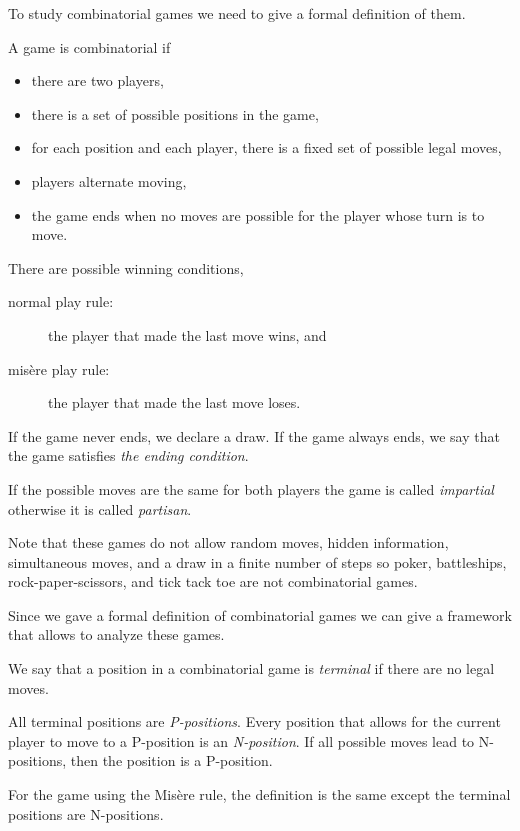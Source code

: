 To study combinatorial games we need to give a formal definition of them.
\begin{definition}
  A game is combinatorial if
  \begin{itemize}
    \item there are two players,
    \item there is a set of possible positions in the game,
    \item for each position and each player, there is a fixed set of possible
      legal moves,
    \item players alternate moving,
    \item the game ends when no moves are possible for the player whose
      turn is to move.
  \end{itemize}
  There are possible winning conditions,
  \begin{description}
    \item [normal play rule:] the player that made the last move wins, and
    \item [mis\`ere play rule:] the player that made the last move loses.
  \end{description}
  If the game never ends, we declare a draw. If the game always ends, we
  say that the game satisfies \emph{the ending condition}.

  If the possible moves are the same for both players the game is
  called \emph{impartial} otherwise it is called \emph{partisan}.
\end{definition}

Note that these games do not allow random moves, hidden information,
simultaneous moves, and a draw in a finite number of steps so
poker, battleships, rock-paper-scissors, and tick tack toe are not
combinatorial games.

Since we gave a formal definition of combinatorial games we can give a framework
that allows to analyze these games.
\begin{definition}
  We say that a position in a combinatorial game is \emph{terminal} if there
  are no legal moves.

  All terminal positions are \emph{P-positions}. Every position that allows for
  the current player to move to a P-position is an \emph{N-position}. If all
  possible moves lead to N-positions, then the position is a P-position.

  For the game using the Mis\`ere rule, the definition is the same except the
  terminal positions are N-positions.
\end{definition}

